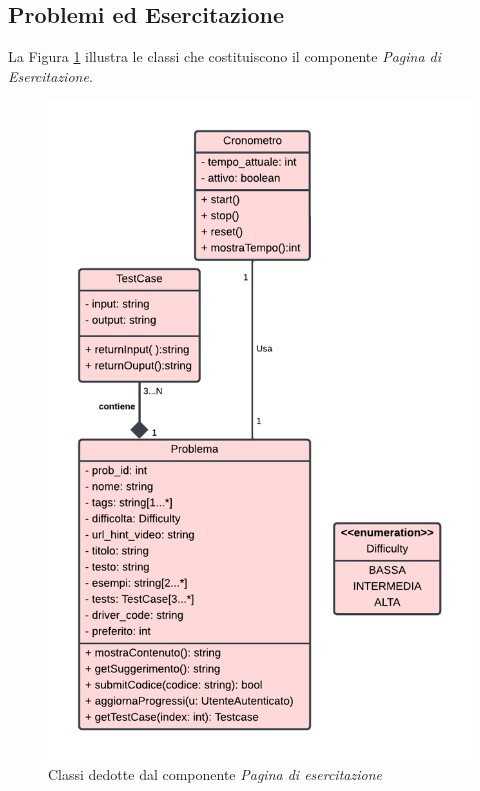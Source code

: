 \documentclass[11pt, a4paper]{article}
\theoremstyle{definition} %
\begin{document}
\newpage
\subsection{Problemi ed Esercitazione}
La Figura \ref{esercitaz} illustra le classi che costituiscono il componente
\textit{Pagina di Esercitazione}.

\begin{figure}[H]
\centering
\includegraphics[scale = 0.85]{materiale/class-esercitazione.pdf}
\caption{Classi dedotte dal componente \textit{Pagina di esercitazione}}
\label{esercitaz}
\end{figure}
\end{document}
